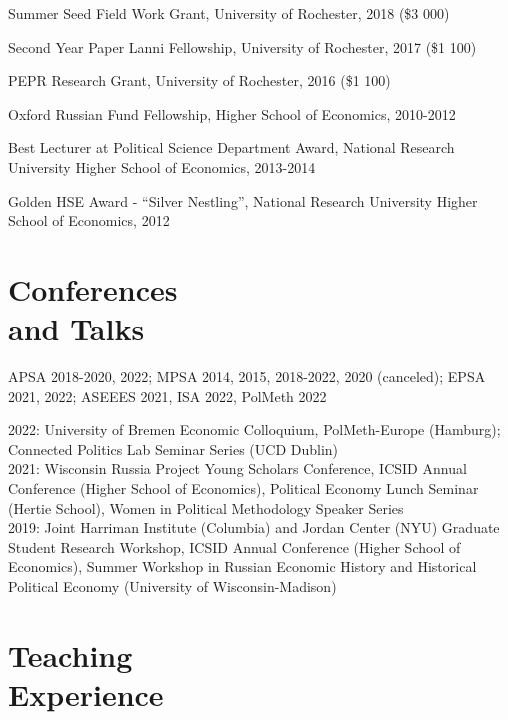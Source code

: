 \documentclass[margin,line,10.95pt]{res}
\begin{document}
\begin{resume}
Summer Seed Field Work Grant, University of Rochester, 2018 (\$3 000)
\vspace*{-4.5mm}

Second Year Paper Lanni Fellowship, University of Rochester, 2017 (\$1 100)
\vspace*{-4.5mm}

PEPR Research Grant, University of Rochester, 2016 (\$1 100)
\vspace*{-4.5mm}


Oxford Russian Fund Fellowship, Higher School of Economics, 2010-2012 
\vspace*{-2.5mm}

Best Lecturer at Political Science Department Award, National Research University Higher School of Economics, 2013-2014 
\vspace*{-4.5mm}

Golden HSE Award - ``Silver Nestling'', National Research University Higher School of Economics, 2012
\vspace*{-2.5mm}


\section{\sc Conferences \\ and Talks}

APSA 2018-2020, 2022; MPSA 2014, 2015, 2018-2022, 2020 (canceled); EPSA 2021, 2022; ASEEES 2021, ISA 2022, PolMeth 2022
  \vspace*{-4.5mm} 

2022: University of Bremen Economic Colloquium, PolMeth-Europe (Hamburg); Connected Politics Lab Seminar Series (UCD Dublin)
\\
2021: Wisconsin Russia Project Young Scholars Conference, ICSID Annual Conference (Higher School of Economics), Political Economy Lunch Seminar (Hertie School), Women in Political Methodology Speaker Series
\\
2019: Joint Harriman Institute (Columbia) and Jordan Center (NYU) Graduate Student Research Workshop,  ICSID Annual Conference (Higher School of Economics), Summer Workshop in Russian Economic History and Historical Political Economy (University of Wisconsin-Madison) 


\section{\sc Teaching \\ Experience}


\end{resume}
\end{document}
